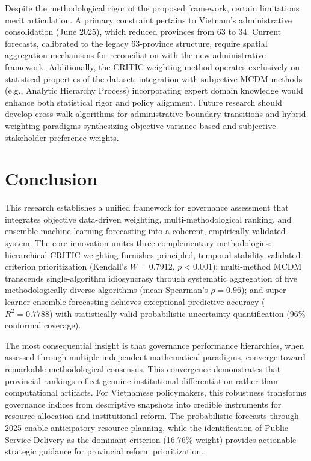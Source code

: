 \documentclass[12pt,a4paper]{article}
\begin{document}
Despite the methodological rigor of the proposed framework, certain limitations merit articulation. A primary constraint pertains to Vietnam's administrative consolidation (June 2025), which reduced provinces from 63 to 34. Current forecasts, calibrated to the legacy 63-province structure, require spatial aggregation mechanisms for reconciliation with the new administrative framework. Additionally, the CRITIC weighting method operates exclusively on statistical properties of the dataset; integration with subjective MCDM methods (e.g., Analytic Hierarchy Process) incorporating expert domain knowledge would enhance both statistical rigor and policy alignment. Future research should develop cross-walk algorithms for administrative boundary transitions and hybrid weighting paradigms synthesizing objective variance-based and subjective stakeholder-preference weights.

\section{Conclusion}
\label{sec:conclusion}

This research establishes a unified framework for governance assessment that integrates objective data-driven weighting, multi-methodological ranking, and ensemble machine learning forecasting into a coherent, empirically validated system. The core innovation unites three complementary methodologies: hierarchical CRITIC weighting furnishes principled, temporal-stability-validated criterion prioritization (Kendall's $W = 0.7912$, $p < 0.001$); multi-method MCDM transcends single-algorithm idiosyncrasy through systematic aggregation of five methodologically diverse algorithms (mean Spearman's $\rho = 0.96$); and super-learner ensemble forecasting achieves exceptional predictive accuracy ($R^2 = 0.7788$) with statistically valid probabilistic uncertainty quantification (96\% conformal coverage).

The most consequential insight is that governance performance hierarchies, when assessed through multiple independent mathematical paradigms, converge toward remarkable methodological consensus. This convergence demonstrates that provincial rankings reflect genuine institutional differentiation rather than computational artifacts. For Vietnamese policymakers, this robustness transforms governance indices from descriptive snapshots into credible instruments for resource allocation and institutional reform. The probabilistic forecasts through 2025 enable anticipatory resource planning, while the identification of Public Service Delivery as the dominant criterion (16.76\% weight) provides actionable strategic guidance for provincial reform prioritization.
\end{document}
